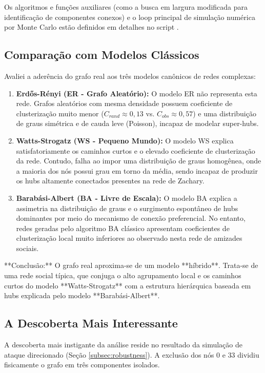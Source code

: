 \documentclass[sigconf]{webmedia}
\begin{document}
Os algoritmos e funções auxiliares (como a busca em largura modificada para identificação de componentes conexos) e o loop principal de simulação numérica por Monte Carlo estão definidos em detalhes no script .

\subsection{Comparação com Modelos Clássicos}
\label{subsec:modelos_classicos}

Avaliei a aderência do grafo real aos três modelos canônicos de redes complexas:
\begin{enumerate}
    \item \textbf{Erdős-Rényi (ER - Grafo Aleatório):} O modelo ER não representa esta rede. Grafos aleatórios com mesma densidade possuem coeficiente de clusterização muito menor ($C_{rand} \approx 0,13$ vs. $C_{obs} \approx 0,57$) e uma distribuição de graus simétrica e de cauda leve (Poisson), incapaz de modelar super-hubs.
    \item \textbf{Watts-Strogatz (WS - Pequeno Mundo):} O modelo WS explica satisfatoriamente os caminhos curtos e o elevado coeficiente de clusterização da rede. Contudo, falha ao impor uma distribuição de graus homogênea, onde a maioria dos nós possui grau em torno da média, sendo incapaz de produzir os hubs altamente conectados presentes na rede de Zachary.
    \item \textbf{Barabási-Albert (BA - Livre de Escala):} O modelo BA explica a assimetria na distribuição de graus e o surgimento espontâneo de hubs dominantes por meio do mecanismo de conexão preferencial. No entanto, redes geradas pelo algoritmo BA clássico apresentam coeficientes de clusterização local muito inferiores ao observado nesta rede de amizades sociais.
\end{enumerate}

**Conclusão:** O grafo real aproxima-se de um modelo **híbrido**. Trata-se de uma rede social típica, que conjuga o alto agrupamento local e os caminhos curtos do modelo **Watts-Strogatz** com a estrutura hierárquica baseada em hubs explicada pelo modelo **Barabási-Albert**.

\subsection{A Descoberta Mais Interessante}
\label{subsec:descoberta_interessante}

A descoberta mais instigante da análise reside no resultado da simulação de ataque direcionado (Seção \ref{subsec:robustness}). A exclusão dos nós $0$ e $33$ dividiu fisicamente o grafo em três componentes isolados. 
\end{document}
